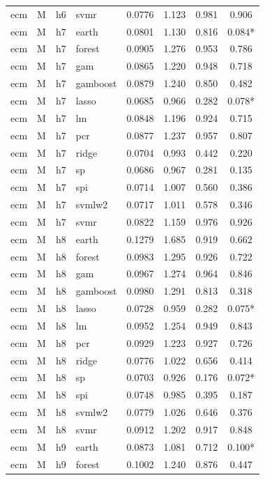\begin{ThreePartTable}
\begin{longtable}[t]{llclcccc}
ecm & M & h6 & svmr & 0.0776 & 1.123 & 0.981 & 0.906\\
\addlinespace
ecm & M & h7 & earth & 0.0801 & 1.130 & 0.816 & 0.084*\\
ecm & M & h7 & forest & 0.0905 & 1.276 & 0.953 & 0.786\\
ecm & M & h7 & gam & 0.0865 & 1.220 & 0.948 & 0.718\\
ecm & M & h7 & gamboost & 0.0879 & 1.240 & 0.850 & 0.482\\
ecm & M & h7 & lasso & 0.0685 & 0.966 & 0.282 & 0.078*\\
ecm & M & h7 & lm & 0.0848 & 1.196 & 0.924 & 0.715\\
ecm & M & h7 & pcr & 0.0877 & 1.237 & 0.957 & 0.807\\
ecm & M & h7 & ridge & 0.0704 & 0.993 & 0.442 & 0.220\\
ecm & M & h7 & sp & 0.0686 & 0.967 & 0.281 & 0.135\\
ecm & M & h7 & spi & 0.0714 & 1.007 & 0.560 & 0.386\\
ecm & M & h7 & svmlw2 & 0.0717 & 1.011 & 0.578 & 0.346\\
ecm & M & h7 & svmr & 0.0822 & 1.159 & 0.976 & 0.926\\
\addlinespace
ecm & M & h8 & earth & 0.1279 & 1.685 & 0.919 & 0.662\\
ecm & M & h8 & forest & 0.0983 & 1.295 & 0.926 & 0.722\\
ecm & M & h8 & gam & 0.0967 & 1.274 & 0.964 & 0.846\\
ecm & M & h8 & gamboost & 0.0980 & 1.291 & 0.813 & 0.318\\
ecm & M & h8 & lasso & 0.0728 & 0.959 & 0.282 & 0.075*\\
ecm & M & h8 & lm & 0.0952 & 1.254 & 0.949 & 0.843\\
ecm & M & h8 & pcr & 0.0929 & 1.223 & 0.927 & 0.726\\
ecm & M & h8 & ridge & 0.0776 & 1.022 & 0.656 & 0.414\\
ecm & M & h8 & sp & 0.0703 & 0.926 & 0.176 & 0.072*\\
ecm & M & h8 & spi & 0.0748 & 0.985 & 0.395 & 0.187\\
ecm & M & h8 & svmlw2 & 0.0779 & 1.026 & 0.646 & 0.376\\
ecm & M & h8 & svmr & 0.0912 & 1.202 & 0.917 & 0.848\\
\addlinespace
ecm & M & h9 & earth & 0.0873 & 1.081 & 0.712 & 0.100*\\
ecm & M & h9 & forest & 0.1002 & 1.240 & 0.876 & 0.447\\

\end{longtable}
\end{ThreePartTable}
